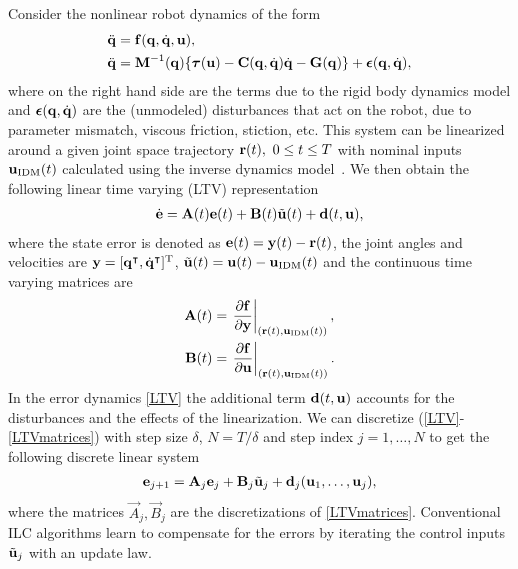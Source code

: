 Consider the nonlinear robot dynamics of the form
%
\begin{equation}
\begin{aligned}
\ddot{\boldsymbol{\mathrm{q}}} &= \boldsymbol{\mathrm{f}}(\boldsymbol{\mathrm{q}},\dot{\boldsymbol{\mathrm{q}}},\boldsymbol{\mathrm{u}}), \\
\ddot{\boldsymbol{\mathrm{q}}} &= \boldsymbol{\mathrm{M}}^{-1}(\boldsymbol{\mathrm{q}})\{ \boldsymbol{\mathrm{\tau}}(\boldsymbol{\mathrm{u}}) - \boldsymbol{\mathrm{C}}(\boldsymbol{\mathrm{q}},\dot{\boldsymbol{\mathrm{q}}})\dot{\boldsymbol{\mathrm{q}}} - \boldsymbol{\mathrm{G}}(\boldsymbol{\mathrm{q}})\} + \boldsymbol{\mathrm{\epsilon}}(\boldsymbol{\mathrm{q}},\dot{\boldsymbol{\mathrm{q}}}),\\
\end{aligned}
\label{dynamics}
\end{equation}
%
\noindent where on the right hand side are the terms due to the rigid body dynamics model and $\boldsymbol{\mathrm{\epsilon}}(\boldsymbol{\mathrm{q}},\dot{\boldsymbol{\mathrm{q}}})$ are the (unmodeled) disturbances that act on the robot, due to parameter mismatch, viscous friction, stiction, etc. This system can be linearized around a given joint space trajectory $\boldsymbol{\mathrm{r}}(t), \ 0 \leq t \leq T$ with nominal inputs $\boldsymbol{\mathrm{u}}_{\mathrm{IDM}}(t)$ calculated using the inverse dynamics model~\cite{Spong06}. We then obtain the following linear time varying (LTV) representation
%
\begin{equation}
\begin{aligned}
\dot{\boldsymbol{\mathrm{e}}} = \boldsymbol{\mathrm{A}}(t)\boldsymbol{\mathrm{e}}(t) + \boldsymbol{\mathrm{B}}(t)\tilde{\boldsymbol{\mathrm{u}}}(t) + \boldsymbol{\mathrm{d}}(t,\boldsymbol{\mathrm{u}}),
\end{aligned}
\label{LTV}
\end{equation}
%
\noindent where the state error is denoted as $\boldsymbol{\mathrm{e}}(t) = \boldsymbol{\mathrm{y}}(t) - \boldsymbol{\mathrm{r}}(t)$, the joint angles and velocities are $\boldsymbol{\mathrm{y}} = [\boldsymbol{\mathrm{q}}^{\intercal},\dot{\boldsymbol{\mathrm{q}}}^{\intercal}]^{\mathrm{T}}$, $\tilde{\boldsymbol{\mathrm{u}}}(t) = \boldsymbol{\mathrm{u}}(t) - \boldsymbol{\mathrm{u}}_{\mathrm{IDM}}(t)$ and the continuous time varying matrices are
%
\begin{equation}
\begin{aligned}
\boldsymbol{\mathrm{A}}(t) &= \left.\frac{\partial{\boldsymbol{\mathrm{f}}}}{\partial{\boldsymbol{\mathrm{y}}}}\right|_{(\boldsymbol{\mathrm{r}}(t),\boldsymbol{\mathrm{u}}_{\mathrm{IDM}}(t))}, \\
\boldsymbol{\mathrm{B}}(t) &= \left.\frac{\partial{\boldsymbol{\mathrm{f}}}}{\partial{\boldsymbol{\mathrm{u}}}}\right|_{(\boldsymbol{\mathrm{r}}(t),\boldsymbol{\mathrm{u}}_{\mathrm{IDM}}(t))}.
\end{aligned}
\label{LTVmatrices}
\end{equation}
%
\noindent In the error dynamics \eqref{LTV} the additional term $\boldsymbol{\mathrm{d}}(t,\boldsymbol{\mathrm{u}})$ accounts for the disturbances and the effects of the linearization. We can discretize (\ref{LTV}-\ref{LTVmatrices}) with step size $\delta$, $N = T/\delta$ and step index $j = 1, \ldots, N$ to get the following discrete linear system
%
\begin{equation}
\begin{aligned}
\boldsymbol{\mathrm{e}}_{j+1} = \boldsymbol{\mathrm{A}}_j\boldsymbol{\mathrm{e}}_j + \boldsymbol{\mathrm{B}}_j\tilde{\boldsymbol{\mathrm{u}}}_j + \boldsymbol{\mathrm{d}}_j(\boldsymbol{\mathrm{u}}_1, \ldots, \boldsymbol{\mathrm{u}}_j),
\end{aligned}
\label{discreteLTV}
\end{equation}
%
\noindent where the matrices $\vec{A}_j, \vec{B}_j$ are the discretizations of \eqref{LTVmatrices}. Conventional ILC algorithms learn to compensate for the errors by iterating the control inputs $\tilde{\boldsymbol{\mathrm{u}}}_j$ with an update law.